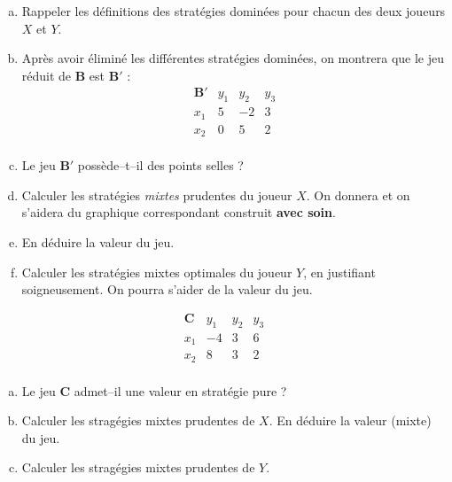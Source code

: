 \documentclass[french,11pt,leqno]{article}
\newcounter{exocount}
\newcounter{questcount}
\def\exo{\bigskip\noindent{\bf Exercice \theexocount {} -}
  \addtocounter{exocount}{1} \setcounter{questcount}{1}}
\begin{document}
\begin{enumerate}[a)]%
\item Rappeler les d\'efinitions des strat\'egies domin\'ees pour chacun des deux joueurs $X$ et $Y$. 
\item Apr\`es avoir \'elimin\'e les diff\'erentes strat\'egies domin\'ees, on montrera que 
le jeu r\'eduit de $\mathbf{B}$ est $\mathbf{B'}$ :
 \begin{equation*}
\begin{array}{l|rrr}
\mathbf{B'} & y_1 & y_2 & y_3 \\ \hline
x_1 & 5 & -2& 3\\
x_2 & 0 & 5& 2\\
\end{array}%
\end{equation*}
\item Le jeu $\mathbf{B'}$ poss\`ede--t--il des points selles ? 
\item Calculer les strat\'egies \emph{mixtes} prudentes du joueur $X$. 
% 
On donnera et on s'aidera du graphique correspondant construit \textbf{avec soin}. 
\item En d\'eduire la valeur du jeu.
\item Calculer les strat\'egies mixtes optimales du joueur $Y$, en justifiant soigneusement. On pourra 
s'aider de la valeur du jeu. 
\end{enumerate}

\exo
\[
\begin{array}{l|rrr}
\mathbf{C} & y_1 & y_2 & y_3  \\ \hline
x_1& -4& 3& 6 \\
x_2& 8& 3 &  2\\
\end{array}
\]
\begin{enumerate}[a)]
\item Le jeu $\mathbf{C}$ admet--il une valeur en strat\'egie pure ?
\item Calculer les strag\'egies mixtes prudentes de $X$. En d\'eduire la valeur (mixte) du jeu.
\item Calculer les strag\'egies mixtes prudentes de $Y$.
\end{enumerate}
\end{document}
